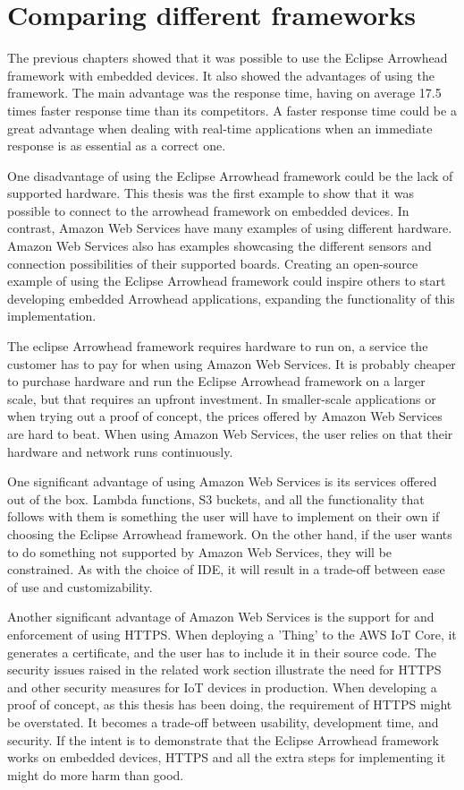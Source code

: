 \section{Comparing different frameworks}
The previous chapters showed that it was possible to use the Eclipse Arrowhead framework with embedded devices. It also showed the advantages of using the framework.
The main advantage was the response time, having on average 17.5 times faster response time than its competitors. 
A faster response time could be a great advantage when dealing with real-time applications when an immediate response is as essential as a correct one. 

One disadvantage of using the Eclipse Arrowhead framework could be the lack of supported hardware.
This thesis was the first example to show that it was possible to connect to the arrowhead framework on embedded devices.
In contrast, Amazon Web Services have many examples of using different hardware. 
Amazon Web Services also has examples showcasing the different sensors and connection possibilities of their supported boards.
Creating an open-source example of using the Eclipse Arrowhead framework could inspire others to start developing embedded Arrowhead applications, expanding the functionality of this implementation.

The eclipse Arrowhead framework requires hardware to run on, a service the customer has to pay for when using Amazon Web Services. 
It is probably cheaper to purchase hardware and run the Eclipse Arrowhead framework on a larger scale, but that requires an upfront investment.
In smaller-scale applications or when trying out a proof of concept, the prices offered by Amazon Web Services are hard to beat.
When using Amazon Web Services, the user relies on that their hardware and network runs continuously.

One significant advantage of using Amazon Web Services is its services offered out of the box.
Lambda functions, S3 buckets, and all the functionality that follows with them is something the user will have to implement on their own if choosing the Eclipse Arrowhead framework.
On the other hand, if the user wants to do something not supported by Amazon Web Services, they will be constrained.
As with the choice of IDE, it will result in a trade-off between ease of use and customizability.

Another significant advantage of Amazon Web Services is the support for and enforcement of using HTTPS.
When deploying a 'Thing' to the AWS IoT Core, it generates a certificate, and the user has to include it in their source code.
The security issues raised in the related work section illustrate the need for HTTPS and other security measures for IoT devices in production.
When developing a proof of concept, as this thesis has been doing, the requirement of HTTPS might be overstated.
It becomes a trade-off between usability, development time, and security. 
If the intent is to demonstrate that the Eclipse Arrowhead framework works on embedded devices, HTTPS and all the extra steps for implementing it might do more harm than good. 

